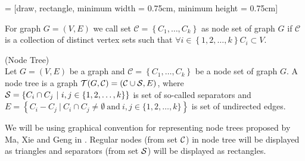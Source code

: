 %
%




 = [draw, rectangle, minimum width = 0.75cm, minimum height = 0.75cm]





For graph $G = (V, E)$ we call set $\mathcal{C} = \left\{ C_1, \dots, C_k\right\}$  
as node set of graph $G$ if $\mathcal{C}$ is a collection of distinct vertex sets such that 
$\forall i \in \left\{1, 2, \dots, k \right\} C_i \subset V$.


\begin{defi} (Node Tree) \\ 
	Let $G = (V, E)$ be a graph and $\mathcal{C} = \left\{ C_1, \dots, C_k\right\}$ be a node set of graph $G$.
	A node tree is a graph $\mathcal{T}(G, \mathcal{C}) = (\mathcal{C} \cup \mathcal{S}, E)$, where 
	$\mathcal{S} = \left\{ C_i \cap C_j \ | \ i, j \in \{1, 2, \dots, k\} \right\}$ is set of so-called separators 
	and $E = \left\{ C_i - C_j \ | \ C_i \cap C_j \neq \emptyset \ \mbox{and} \ i, j \in \{1, 2, \dots, k \} \right\}$ 
	is set of undirected edges.
\end{defi}

We will be using graphical convention for representing node trees proposed by Ma, Xie and Geng in \cite{CG}. Regular nodes (from set $\mathcal{C}$) in node tree will be displayed as triangles and separators (from set $\mathcal{S}$) will be displayed as rectangles.



